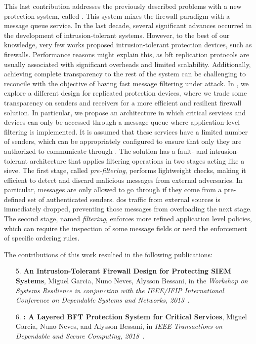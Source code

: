 This last contribution addresses the previously described problems with a new protection system, called \sieveq.
This system mixes the firewall paradigm with a message queue service.
In the last decade, several significant advances occurred in the development of intrusion-tolerant systems.
However, to the best of our knowledge, very few works proposed intrusion-tolerant protection devices, such as firewalls.
Performance reasons might explain this, as \gls{bft} replication protocols are usually associated with significant overheads and limited scalability.
Additionally, achieving complete transparency to the rest of the system can be challenging to reconcile with the objective of having fast message filtering under attack.
In \sieveq, we explore a different design for replicated protection devices, where we trade some transparency on senders and receivers for a more efficient and resilient firewall solution.
In particular, we propose an architecture in which critical services and devices can only be accessed through a message queue where application-level filtering is implemented.
It is assumed that these services have a limited number of senders, which can be appropriately configured to ensure that only they are authorized to communicate through \sieveq.
The solution has a fault- and intrusion-tolerant architecture that applies filtering operations in two stages acting like a sieve.
The first stage, called \emph{pre-filtering}, performs lightweight checks, making it efficient to detect and discard malicious messages from external adversaries.
In particular, messages are only allowed to go through if they come from a pre-defined set of authenticated senders.
\gls{dos} traffic from external sources is immediately dropped, preventing those messages from overloading the next stage.
The second stage, named \emph{filtering}, enforces more refined application level policies, which can require the inspection of some message fields or need the enforcement of specific ordering rules.

The contributions of this work resulted in the following publications:

\begin{enumerate}
\item[5.] \textbf{An Intrusion-Tolerant Firewall Design for Protecting SIEM Systems}, Miguel Garcia, Nuno Neves, Alysson Bessani, in the \emph{Workshop on Systems Resilience in conjunction with the IEEE/IFIP International Conference on Dependable Systems and Networks, 2013}~\cite{Garcia:2013}.

\item[6.] \textbf{\sieveq: A Layered BFT Protection System for Critical Services}, Miguel Garcia, Nuno Neves, and Alysson Bessani, in \emph{IEEE Transactions on Dependable and Secure Computing, 2018}~\cite{Garcia:2016}.
\end{enumerate}


